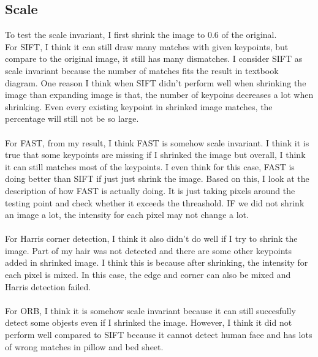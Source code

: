 \documentclass{article}
\begin{document}
\subsection*{Scale}
To test the scale invariant, I first shrink the image to 0.6 of the original.\\
For SIFT, I think it can still draw many matches with given keypoints, but compare to the original image, it still has many dismatches.
I consider SIFT as scale invariant because the number of matches fits the result in textbook diagram.
One reason I think when SIFT didn't perform well when shrinking the image than expanding image is that, the number of keypoins decreases a lot when shrinking.
Even every existing keypoint in shrinked image matches, the percentage will still not be so large.\\
\\
For FAST, from my result, I think FAST is somehow scale invariant.
I think it is true that some keypoints are missing if I shrinked the image but overall, I think it can still matches most of the keypoints.
I even think for this case, FAST is doing better than SIFT if just just shrink the image.
Based on this, I look at the description of how FAST is actually doing.
It is just taking pixels around the testing point and check whether it exceeds the threashold. 
IF we did not shrink an image a lot, the intensity for each pixel may not change a lot.\\
\\
For Harris corner detection, I think it also didn't do well if I try to shrink the image.
Part of my hair was not detected and there are some other keypoints added in shrinked image.
I think this is because after shrinking, the intensity for each pixel is mixed.
In this case, the edge and corner can also be mixed and Harris detection failed.\\
\\
For ORB, I think it is somehow scale invariant because it can still succesfully detect some objests even if I shrinked the image.
However, I think it did not perform well compared to SIFT because it cannot detect human face and has lots of wrong matches in pillow and bed sheet.
\end{document}
